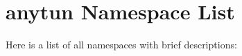 \section{anytun Namespace List}
Here is a list of all namespaces with brief descriptions:\begin{CompactList}
\item{}
\item{}
\item{}
\end{CompactList}
